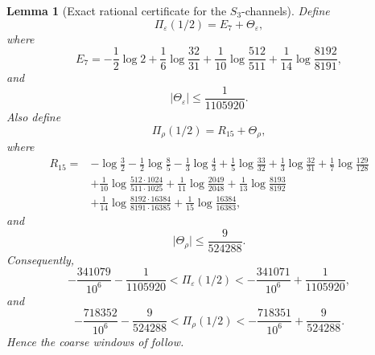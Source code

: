 \documentclass[11pt,a4paper]{amsart}
\theoremstyle{plain}
\newtheorem{lemma}[theorem]{Lemma}
\theoremstyle{definition}
\theoremstyle{remark}
\newcommand{\abs}[1]{\lvert #1 \rvert}
\begin{document}
\begin{lemma}[Exact rational certificate for the \(S_3\)-channels]
  \label{lem:appendix-s3-sharp-certificates}
  Define
  \begin{equation}\label{eq:s3-example-epsilon-certificate-sum}
    \Pi_\varepsilon(1/2)=E_7+\Theta_\varepsilon,
  \end{equation}
  where
  \[
    E_7
    =
    -\frac12\log 2
    +\frac16\log\frac{32}{31}
    +\frac1{10}\log\frac{512}{511}
    +\frac1{14}\log\frac{8192}{8191},
  \]
  and
  \begin{equation}\label{eq:s3-example-epsilon-tail-certificate}
    \abs{\Theta_\varepsilon}\le \frac{1}{1105920}.
  \end{equation}
  Also define
  \begin{equation}\label{eq:s3-example-rho-certificate-sum}
    \Pi_\rho(1/2)=R_{15}+\Theta_\rho,
  \end{equation}
  where
  \[
  \begin{aligned}
    R_{15}
    ={}&
    -\log\frac32
    -\frac12\log\frac85
    -\frac13\log\frac43
    +\frac15\log\frac{33}{32}
    +\frac13\log\frac{32}{31}
    +\frac17\log\frac{129}{128} \\
    &+\frac1{10}\log\frac{512\cdot 1024}{511\cdot 1025}
    +\frac1{11}\log\frac{2049}{2048}
    +\frac1{13}\log\frac{8193}{8192} \\
    &+\frac1{14}\log\frac{8192\cdot 16384}{8191\cdot 16385}
    +\frac1{15}\log\frac{16384}{16383},
  \end{aligned}
  \]
  and
  \begin{equation}\label{eq:s3-example-rho-tail-certificate}
    \abs{\Theta_\rho}\le \frac{9}{524288}.
  \end{equation}
  Consequently,
  \begin{equation}\label{eq:s3-example-certified-intervals-sharp}
    -\frac{341079}{10^6}-\frac{1}{1105920}
    <\Pi_\varepsilon(1/2)<
    -\frac{341071}{10^6}+\frac{1}{1105920},
  \end{equation}
  and
  \begin{equation}\label{eq:s3-example-certified-intervals-sharp-rho}
    -\frac{718352}{10^6}-\frac{9}{524288}
    <\Pi_\rho(1/2)<
    -\frac{718351}{10^6}+\frac{9}{524288}.
  \end{equation}
  Hence the coarse windows of
   follow.
\end{lemma}
\end{document}

